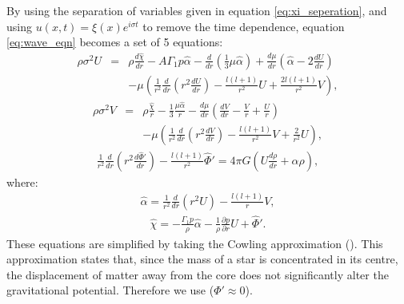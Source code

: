 \documentclass[fleqn,usenatbib]{mnras}
\begin{document}
\hspace{\parindent}By using the separation of variables given in equation \ref{eq:xi_seperation}, and using $u(x,t)=\xi(x)e^{i\sigma t}$ to remove the time dependence, equation \ref{eq:wave_eqn} becomes a set of 5 equations:
\begin{eqnarray}\nonumber
\rho\sigma^2U&=& \rho\frac{d\hat{\chi}}{dr}-A\Gamma_1 p\hat{\alpha}-\frac{d}{dr}\left(\frac{1}{3}\mu\hat{\alpha}\right)+\frac{d\mu}{dr}\left(\hat{\alpha}-2\frac{dU}{dr}\right)\\
&&-\mu\left(\frac{1}{r^2}\frac{d}{dr}\left( r^2\frac{dU}{dr}\right)-\frac{l(l+1)}{r^2}U+\frac{2l(l+1)}{r^2}V\right),
\label{eq:Ueqn}
\end{eqnarray}
\begin{eqnarray}\nonumber
\rho\sigma^2V&=&\rho\frac{\hat{\chi}}{r}-\frac{1}{3}\frac{\mu\hat{\alpha}}{r}-\frac{d\mu}{dr}\left(\frac{dV}{dr}-\frac{V}{r}+\frac{U}{r}\right)\\
&&-\mu\left(\frac{1}{r^2}\frac{d}{dr}\left(r^2\frac{dV}{dr}\right)-\frac{l(l+1)}{r^2}V+\frac{2}{r^2}U\right),
\label{eq:Veqn}
\end{eqnarray}
\begin{align}
\frac{1}{r^2}\frac{d}{dr}\left(r^2\frac{d\hat{\Phi}'}{dr}\right)-\frac{l(l+1)}{r^2}\hat{\Phi}'=4\pi G\left(U\frac{d\rho}{dr}+\hat{\alpha}\rho\right),
\label{eq:Phihat_eqn}
\end{align}
\noindent where:
\begin{align}
\hat{\alpha}=\frac{1}{r^2}\frac{d}{dr}(r^2U)-\frac{l(l+1)}{r}V,
\label{eq:alphahat}
\end{align}
\begin{align}
\hat{\chi}=-\frac{\Gamma_1p}{\rho}\hat{\alpha}-\frac{1}{\rho}\frac{\partial p}{\partial r}U+\hat{\Phi}'.
\label{eq:chihat}
\end{align}
\noindent These equations are simplified by taking the Cowling approximation (\cite{cowling1941non}). This approximation states that, since the mass of a star is concentrated in its centre, the displacement of matter away from the core does not significantly alter the gravitational potential. Therefore we use ($\Phi '\approx 0$).
\end{document}
